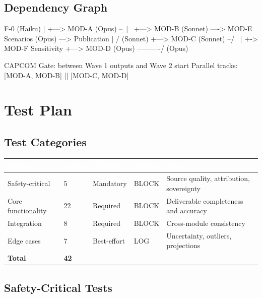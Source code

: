 \documentclass[11pt,letterpaper]{article}
\newcommand{\tableheader}[1]{\textbf{\sffamily\textcolor{white}{#1}}}
\begin{document}
\subsection{Dependency Graph}

\begin{asciibox}
F-0 (Haiku)
 |
 +---> MOD-A (Opus)   --\
 |                       \
 +---> MOD-B (Sonnet) ----> MOD-E Scenarios (Opus) ---> Publication
 |                       /                               (Sonnet)
 +---> MOD-C (Sonnet) --/    \
 |                            +-> MOD-F Sensitivity
 +---> MOD-D (Opus) ----------/   (Opus)

CAPCOM Gate: between Wave 1 outputs and Wave 2 start
Parallel tracks: [MOD-A, MOD-B] || [MOD-C, MOD-D]
\end{asciibox}

\section{Test Plan}

\subsection{Test Categories}

\begin{center}
\begin{tabularx}{\textwidth}{L{3cm}C{1.5cm}C{2cm}C{2cm}X}
\toprule
\rowcolor{tertiary}
\tableheader{Category} & \tableheader{Count} & \tableheader{Priority} & \tableheader{Failure} & \tableheader{Focus} \\
\midrule
Safety-critical & 5 & Mandatory & BLOCK & Source quality, attribution, sovereignty \\
Core functionality & 22 & Required & BLOCK & Deliverable completeness and accuracy \\
Integration & 8 & Required & BLOCK & Cross-module consistency \\
Edge cases & 7 & Best-effort & LOG & Uncertainty, outliers, projections \\
\midrule
\textbf{Total} & \textbf{42} & & & \\
\bottomrule
\end{tabularx}
\end{center}

\subsection{Safety-Critical Tests}
\end{document}
